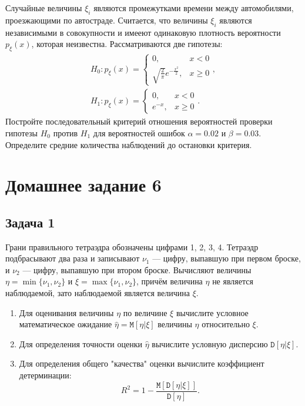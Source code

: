 \documentclass[a4paper,12pt]{article}
\newcommand{\expectation}[1]{\mathtt{M} \left[ #1 \right]}
\newcommand{\cexpectation}[2]{\mathtt{M} \left[ #1 | #2 \right]}
\newcommand{\variance}[1]{\mathtt{D} \left[ #1 \right]}
\newcommand{\cvariance}[2]{\mathtt{D} \left[ #1 | #2 \right]}
\begin{document}
Случайные величины $\xi_i$ являются промежутками времени между автомобилями, проезжающими по автостраде. Считается, что величины $\xi_i$ являются
независимыми в совокупности и имееют одинаковую плотность вероятности $p_\xi(x)$, которая неизвестна. Рассматриваются две гипотезы:
\begin{gather*}
    H_0:
    p_\xi(x) = \left \{
    \begin{array}{ll}
        0,                                       & x < 0   \\
        \sqrt{\frac{2}{\pi}} e^{-\frac{x^2}{2}}, & x \ge 0
    \end{array}
    \right . , \\
    H_1:
    p_\xi(x) = \left \{
    \begin{array}{ll}
        0,      & x < 0   \\
        e^{-x}, & x \ge 0
    \end{array}
    \right . .
\end{gather*}
Постройте последовательный критерий отношения вероятностей проверки гипотезы $H_0$ против $H_1$ для вероятностей ошибок $\alpha = 0.02$ и $\beta = 0.03$.
Определите средние количества наблюдений до остановки критерия.

\section*{Домашнее задание 6}

\subsection*{Задача 1}

Грани правильного тетраэдра обозначены цифрами 1, 2, 3, 4. Тетраэдр подбрасывают два раза и записывают $\nu_1$ --- цифру, выпавшую при первом броске,
и $\nu_2$ --- цифру, выпавшую при втором броске. Вычисляют величины $\eta = \min \{ \nu_1, \nu_2 \}$ и $\xi = \max \{ \nu_1, \nu_2 \}$, причём
величина $\eta$ не является наблюдаемой, зато наблюдаемой является величина $\xi$.
\begin{enumerate}
    \item Для оценивания величины $\eta$ по величине $\xi$ вычислите условное математическое ожидание $\widehat{\eta} = \cexpectation{\eta}{\xi}$ величины $\eta$ относительно $\xi$.
    \item Для определения точности оценки $\widehat{\eta}$ вычислите условную дисперсию $\cvariance{\eta}{\xi}$.
    \item Для определения общего "качества"{} оценки вычислите коэффициент детерминации:
          \[
              R^2 = 1 - \frac{\expectation{\cvariance{\eta}{\xi}}}{\variance{\eta}}.
          \]
\end{enumerate}
\end{document}
